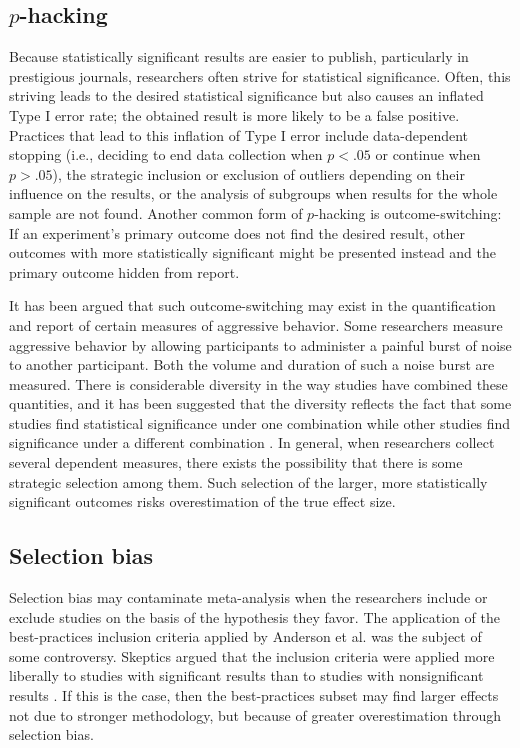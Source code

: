 \documentclass[man, mask]{apa6}
\begin{document}
\subsection{$p$-hacking}
Because statistically significant results are easier to publish, particularly in prestigious journals, researchers often strive for statistical significance. Often, this striving leads to the desired statistical significance but also causes an inflated Type I error rate; the obtained result is more likely to be a false positive. Practices that lead to this inflation of Type I error include data-dependent stopping (i.e., deciding to end data collection when $p < .05$ or continue when $p > .05$), the strategic inclusion or exclusion of outliers depending on their influence on the results, or the analysis of subgroups when results for the whole sample are not found. Another common form of $p$-hacking is outcome-switching: If an experiment's primary outcome does not find the desired result, other outcomes with more statistically significant might be presented instead and the primary outcome hidden from report.

It has been argued that such outcome-switching may exist in the quantification and report of certain measures of aggressive behavior. Some researchers measure aggressive behavior by allowing participants to administer a painful burst of noise to another participant. Both the volume and duration of such a noise burst are measured.  There is considerable diversity in the way studies have combined these quantities, and it has been suggested that the diversity reflects the fact that some studies find statistical significance under one combination while other studies find significance under a different combination \citep{Elson:etal:2014}.  In general, when researchers collect several dependent measures, there exists the possibility that there is some strategic selection among them. Such selection of the larger, more statistically significant outcomes risks overestimation of the true effect size. 


\subsection{Selection bias}
Selection bias may contaminate meta-analysis when the researchers include or exclude studies on the basis of the hypothesis they favor. The application of the best-practices inclusion criteria applied by Anderson et al. was the subject of some controversy. Skeptics argued that the inclusion criteria were applied more liberally to studies with significant results than to studies with nonsignificant results \citep{Ferguson:2010}. If this is the case, then the best-practices subset may find larger effects not due to stronger methodology, but because of greater overestimation through selection bias. 
\end{document}
